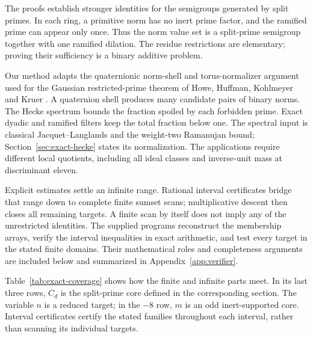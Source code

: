 The proofs establish stronger identities for the semigroups generated
by split primes.  In each ring, a primitive norm has no inert prime
factor, and the ramified prime can appear only once.  Thus the norm
value set is a split-prime semigroup together with one ramified
dilation.  The residue restrictions are elementary; proving their
sufficiency is a binary additive problem.

Our method adapts the quaternionic norm-shell and torus-normalizer
argument used for the Gaussian restricted-prime theorem of Howe,
Huffman, Kohlmeyer and Kruer \cite[Theorem~1.1]{Euler}.  A quaternion
shell produces many candidate pairs of binary norms.  The Hecke
spectrum bounds the fraction spoiled by each forbidden prime.
Exact dyadic and ramified filters keep the total fraction below one.
The spectral input is classical Jacquet--Langlands and the weight-two
Ramanujan bound; Section~\ref{sec:exact-hecke} states its normalization.
The applications require different local quotients, including all ideal
classes and inverse-unit mass at discriminant eleven.

Explicit estimates settle an infinite range.  Rational interval
certificates bridge that range down to complete finite sumset scans;
multiplicative descent then closes all remaining targets.  A finite
scan by itself does not imply any of the unrestricted identities.
The supplied programs reconstruct the membership arrays, verify the
interval inequalities in exact arithmetic, and test every target in
the stated finite domains.  Their mathematical roles and completeness
arguments are included below and summarized in
Appendix~\ref{app:verifier}.

Table~\ref{tab:exact-coverage} shows how the finite and infinite parts
meet.  In its last three rows, $C_d$ is the split-prime core defined in
the corresponding section.  The variable $n$ is a reduced target; in
the $-8$ row, $m$ is an odd inert-supported core.  Interval certificates
certify the stated families throughout each interval, rather than
scanning its individual targets.

